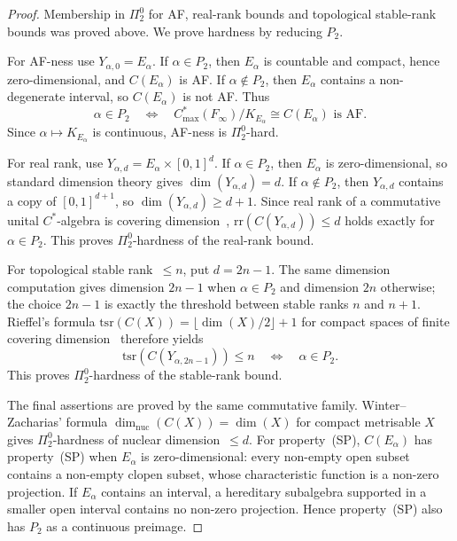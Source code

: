 \documentclass[12pt,fleqn,a4paper]{amsart}
\renewcommand{\le}{\leqslant}
\renewcommand{\ge}{\geqslant}
\numberwithin{equation}{section}
\theoremstyle{definition}
\begin{document}
\begin{proof}
Membership in $\Pi^0_2$ for AF, real-rank bounds and topological stable-rank bounds was
proved above.  We prove hardness by reducing $P_2$.

For AF-ness use $Y_{\alpha,0}=E_\alpha$.  If $\alpha\in P_2$, then $E_\alpha$ is
countable and compact, hence zero-dimensional, and $C(E_\alpha)$ is AF.  If
$\alpha\notin P_2$, then $E_\alpha$ contains a non-degenerate interval, so
$C(E_\alpha)$ is not AF.  Thus
\[
        \alpha\in P_2
        \quad\Longleftrightarrow\quad
        C^*_{\max}(F_\infty)/K_{E_\alpha}\cong C(E_\alpha)\text{ is AF}.
\]
Since $\alpha\mapsto K_{E_\alpha}$ is continuous, AF-ness is $\Pi^0_2$-hard.

For real rank, use $Y_{\alpha,d}=E_\alpha\times[0,1]^d$.  If $\alpha\in P_2$, then
$E_\alpha$ is zero-dimensional, so standard dimension theory gives
$\dim(Y_{\alpha,d})=d$.  If $\alpha\notin P_2$, then $Y_{\alpha,d}$ contains a copy of
$[0,1]^{d+1}$, so $\dim(Y_{\alpha,d})\ge d+1$.  Since real rank of a commutative
unital $C^*$-algebra is covering dimension~\cite{BrownPedersen1991}, $\mathrm{rr}(C(Y_{\alpha,d}))\le d$ holds
exactly for $\alpha\in P_2$.  This proves $\Pi^0_2$-hardness of the real-rank bound.

For topological stable rank~$\le n$, put $d=2n-1$.  The same dimension computation
gives dimension $2n-1$ when $\alpha\in P_2$ and dimension $2n$ otherwise; the
choice $2n-1$ is exactly the threshold between stable ranks $n$ and $n+1$.
Rieffel's formula
$\mathrm{tsr}(C(X))=\lfloor \dim(X)/2\rfloor+1$ for compact spaces of finite covering
dimension~\cite{Rieffel1983} therefore yields
\[
        \mathrm{tsr}(C(Y_{\alpha,2n-1}))\le n
        \quad\Longleftrightarrow\quad
        \alpha\in P_2.
\]
This proves $\Pi^0_2$-hardness of the stable-rank bound.

The final assertions are proved by the same commutative family.  Winter--Zacharias'
formula $\dim_{\mathrm{nuc}}(C(X))=\dim(X)$ for compact metrisable $X$
\cite{WinterZacharias} gives $\Pi^0_2$-hardness of nuclear dimension~$\le d$.
For property~(SP), $C(E_\alpha)$ has property~(SP) when $E_\alpha$ is zero-dimensional:
every non-empty open subset contains a non-empty clopen subset, whose characteristic
function is a non-zero projection.  If $E_\alpha$ contains an interval, a hereditary
subalgebra supported in a smaller open interval contains no non-zero projection.  Hence
property~(SP) also has $P_2$ as a continuous preimage.
\end{proof}
\end{document}
